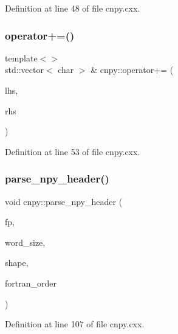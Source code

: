 Definition at line 48 of file cnpy.\+cxx.

\mbox{\label{namespacecnpy_adde4f7c4e52778f1e28effe4ae80bef3}} 
\subsubsection{\texorpdfstring{operator+=()}{operator+=()}\hspace{0.1cm}{\footnotesize\ttfamily [3/3]}}
{\footnotesize\ttfamily template$<$$>$ \\
std\+::vector$<$ char $>$ \& cnpy\+::operator+= (\begin{DoxyParamCaption}\item[{std\+::vector$<$ char $>$ \&}]{lhs,  }\item[{const char $\ast$}]{rhs }\end{DoxyParamCaption})}



Definition at line 53 of file cnpy.\+cxx.

\mbox{\label{namespacecnpy_adb801e369cfcf2e47c4b0348dcb54787}} 
\subsubsection{\texorpdfstring{parse\+\_\+npy\+\_\+header()}{parse\_npy\_header()}\hspace{0.1cm}{\footnotesize\ttfamily [1/2]}}
{\footnotesize\ttfamily void cnpy\+::parse\+\_\+npy\+\_\+header (\begin{DoxyParamCaption}\item[{F\+I\+LE $\ast$}]{fp,  }\item[{size\+\_\+t \&}]{word\+\_\+size,  }\item[{std\+::vector$<$ size\+\_\+t $>$ \&}]{shape,  }\item[{bool \&}]{fortran\+\_\+order }\end{DoxyParamCaption})}



Definition at line 107 of file cnpy.\+cxx.

